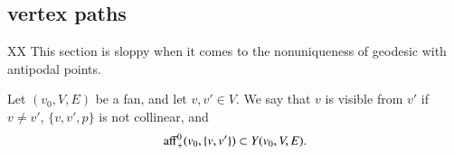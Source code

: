 


%




\subsection{vertex paths} %


XX This section is sloppy when it comes to the nonuniqueness of geodesic
with antipodal points.



\begin{definition}
Let $(v_0,V,E)$ be a fan, and let $v,v'\in V$.  We say
that $v$ is visible from $v'$ if $v\ne v'$, $\{v,v',p\}$ is not
collinear,  and
  $${\operatorname{aff}}_+^0(v_0,\{v,v'\})\subset Y(v_0,V,E).$$
\end{definition}

